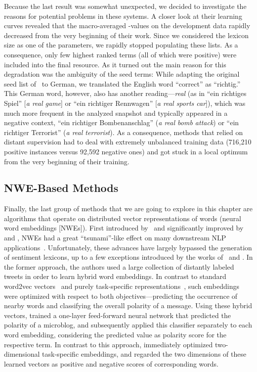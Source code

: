 Because the last result was somewhat unexpected, we decided to
investigate the reasons for potential problems in these systems.  A
closer look at their learning curves revealed that the macro-averaged
\F{}-values on the development data rapidly decreased from the very
beginning of their work.  Since we considered the lexicon size as one
of the parameters, we rapidly stopped populating these lists.  As a
consequence, only few highest ranked terms (all of which were
positive) were included into the final resource.  As it turned out the
main reason for this degradation was the ambiguity of the seed terms:
While adapting the original seed list of~\citet{Turney:03} to German,
we translated the English word ``correct'' as ``richtig.''  This
German word, however, also has another reading---\emph{real} (as in
``ein richtiges Spiel'' [\emph{a real game}] or ``ein richtiger
Rennwagen'' [\emph{a real sports car}]), which was much more frequent
in the analyzed snapshot and typically appeared in a negative context,
\eg{} ``ein richtiger Bombenanschlag'' (\emph{a real bomb attack}) or
``ein richtiger Terrorist'' (\emph{a real terrorist}).  As a
consequence, methods that relied on distant supervision had to deal
with extremely unbalanced training data (716,210 positive instances
versus 92,592 negative ones) and got stuck in a local optimum from the
very beginning of their training.

\subsection{NWE-Based Methods}\label{subsec:snt:lex:nwe}

Finally, the last group of methods that we are going to explore in
this chapter are algorithms that operate on distributed vector
representations of words (neural word embeddings [NWEs]).  First
introduced by~\citet{Bengio:03} and significantly improved by
\citet{Collobert:11} and \citet{Mikolov:13}, NWEs had a great
``tsunami''-like effect on many downstream NLP
applications~\cite{Manning:15}.  Unfortunately, these advances have
largely bypassed the generation of sentiment lexicons, up to a few
exceptions introduced by the works of~\citet{Tang:14a} and
\citet{Vo:16}.  In the former approach, the authors used a large
collection of distantly labeled tweets in order to learn hybrid word
embeddings.  In contrast to standard word2vec
vectors~\cite{Mikolov:13} and purely task-specific
representations~\cite{Collobert:11}, such embeddings were optimized
with respect to both objectives---predicting the occurrence of nearby
words and classifying the overall polarity of a message.  Using these
hybrid vectors, \citeauthor{Tang:14a} trained a one-layer feed-forward
neural network that predicted the polarity of a microblog, and
subsequently applied this classifier separately to each word
embedding, considering the predicted value as polarity score for the
respective term.  In contrast to this approach, \citeauthor{Vo:16}
immediately optimized two-dimensional task-specific embeddings, and
regarded the two dimensions of these learned vectors as positive and
negative scores of corresponding words.

